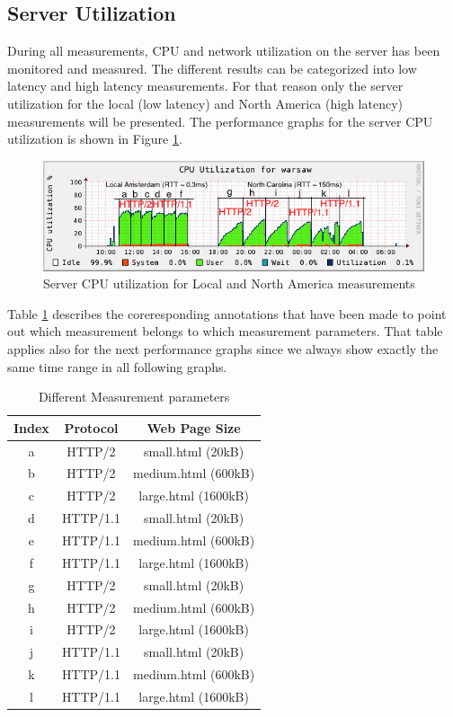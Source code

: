 \subsection{Server Utilization}
\label{subsec:server_util}

During all measurements, CPU and network utilization on the server has been monitored and measured. The different results can be categorized into low latency and high latency measurements. For that reason only the server utilization for the local (low latency) and North America (high latency) measurements will be presented. The performance graphs for the server CPU utilization is shown in Figure \ref{fig:cpu}.  

\begin{figure}[H]
\centering
\includegraphics[scale=0.6,trim=0.0cm .0cm .0cm .0cm,clip]{images/cpu2.png}
\caption{Server CPU utilization for Local and North America measurements}
\label{fig:cpu}
\end{figure}

Table \ref{table:cpu} describes the coreresponding annotations that have been made to point out which measurement belongs to which measurement parameters. That table applies also for the next performance graphs since we always show exactly the same time range in all following graphs.

\begin{table}[h]
	\centering
\begin{tabular}{ | c | c | c | }

\hline
\textbf{Index} &\textbf{Protocol} &\textbf{Web Page Size}\\ \hline \hline
a & HTTP/2 & small.html (20kB)\\ \hline
b & HTTP/2 & medium.html (600kB)\\ \hline
c & HTTP/2 & large.html (1600kB)\\ \hline
d & HTTP/1.1 & small.html (20kB) \\ \hline
e & HTTP/1.1 & medium.html (600kB) \\ \hline
f & HTTP/1.1 & large.html (1600kB)\\ \hline 
g & HTTP/2 & small.html (20kB)\\ \hline
h & HTTP/2 & medium.html (600kB)\\ \hline
i & HTTP/2 & large.html (1600kB)\\ \hline
j & HTTP/1.1 & small.html (20kB) \\ \hline
k & HTTP/1.1 & medium.html (600kB) \\ \hline
l & HTTP/1.1 & large.html (1600kB)\\  
\hline
\end{tabular}
\caption{Different Measurement parameters}
\label{table:cpu}
\end{table} 
 
